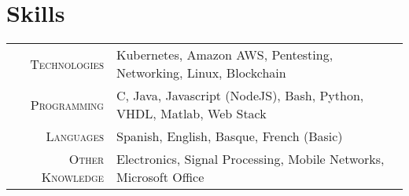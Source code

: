 \documentclass[a4paper,10pt]{article}
\begin{document}
 \section{Skills}
\begin{tabular}{r|l}
\textsc{Technologies} & Kubernetes, Amazon AWS, Pentesting, Networking, Linux, Blockchain  \\
\textsc{Programming} & C, Java, Javascript (NodeJS), Bash, Python, VHDL, Matlab, Web Stack \\
\textsc{Languages} & Spanish, English, Basque, French (Basic) \\
\textsc{Other Knowledge} & Electronics, Signal Processing, Mobile Networks, Microsoft Office \\
\end{tabular}


\end{document}
